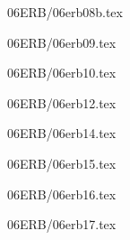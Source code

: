 \documentclass[9pt, xcolor={svgnames, x11names},professionalfonts]{beamer}
\def\scale{1}
\begin{document}

\begin{frame}{06ERB/06erb08b.tex}	
		\def\scale{0.75}
		
\end{frame}


\begin{frame}{06ERB/06erb09.tex}	
		\def\scale{0.625}
		\tcb{
			
		}		
\end{frame}


\begin{frame}{06ERB/06erb10.tex}	
		\def\scale{0.625}
		
\end{frame}


\begin{frame}{06ERB/06erb12.tex}	
		\def\scale{0.625}
		
\end{frame}


\begin{frame}{06ERB/06erb14.tex}	
	\def\scale{0.55}
	
\end{frame}

\begin{frame}{06ERB/06erb15.tex}	
	\def\scale{0.75}
	
\end{frame}


\begin{frame}{06ERB/06erb16.tex}	
	\def\scale{1}
	
\end{frame}


\begin{frame}{06ERB/06erb17.tex}	
	\def\scale{0.625}
	
\end{frame}
\end{document}
